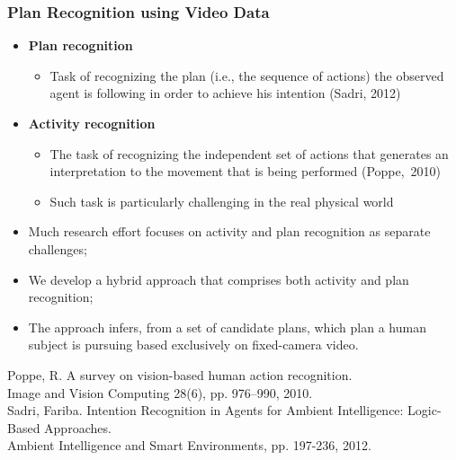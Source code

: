 \documentclass{beamer}
\begin{document}
\begin{frame}[c]\frametitle{Plan Recognition using Video Data}
	\begin{itemize}
   		\item \textbf{Plan recognition}
   		\begin{itemize}
				\item Task of recognizing the plan (i.e., the sequence of actions) the observed agent is following in order to achieve his intention (Sadri, 2012)
	    \end{itemize}
		\item \textbf{Activity recognition}
			\begin{itemize}
				\item The task of recognizing the independent set of actions that generates an interpretation to the movement that is being performed (Poppe,~2010)
				\item Such task is particularly challenging in the real physical world
			 \end{itemize}
		\item Much research effort focuses on activity and plan recognition as separate challenges;
		\item We develop a hybrid approach that comprises both activity and plan recognition;
		\item The approach infers, from a set of candidate plans, which plan a human subject is pursuing based exclusively on fixed-camera video.
	\end{itemize}
	\begin{flushright}
	{\tiny Poppe, R. A survey on vision-based human action recognition. \\Image and Vision Computing 28(6), pp. 976–990, 2010. \\
	       Sadri, Fariba. Intention Recognition in Agents for Ambient Intelligence: Logic-Based Approaches. \\ Ambient Intelligence and Smart Environments, pp. 197-236, 2012.
	}
	\end{flushright}
\end{frame}
\end{document}

